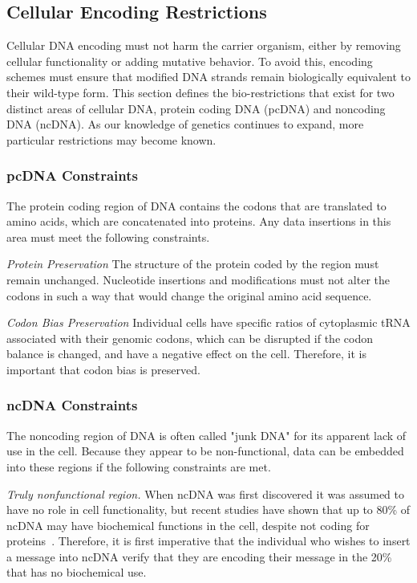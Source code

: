 \documentclass{bioinfo}
\begin{document}
\subsection{Cellular Encoding Restrictions}

Cellular DNA encoding must not harm the carrier organism, either by removing cellular functionality or adding mutative behavior. To avoid this, encoding schemes must ensure that modified DNA strands remain biologically equivalent to their wild-type form. This section defines the bio-restrictions that exist for two distinct areas of cellular DNA, protein coding DNA (pcDNA) and noncoding DNA (ncDNA). As our knowledge of genetics continues to expand, more particular restrictions may become known.

\subsubsection{pcDNA Constraints}

The protein coding region of DNA contains the codons that are translated to amino acids, which are concatenated into proteins. Any data insertions in this area must meet the following constraints.

\textit{Protein Preservation} The structure of the protein coded by the region must remain unchanged. Nucleotide insertions and modifications must not alter the codons in such a way that would change the original amino acid sequence.

\textit{Codon Bias Preservation} Individual cells have specific ratios of cytoplasmic tRNA associated with their genomic codons, which can be disrupted if the codon balance is changed, and have a negative effect on the cell. Therefore, it is important that codon bias is preserved.

\subsubsection{ncDNA Constraints}

The noncoding region of DNA is often called "junk DNA" for its apparent lack of use in the cell. Because they appear to be non-functional, data can be embedded into these regions if the following constraints are met.

\textit{Truly nonfunctional region.} When ncDNA was first discovered it was assumed to have no role in cell functionality, but recent studies have shown that up to 80\% of ncDNA may have biochemical functions in the cell, despite not coding for proteins~\cite{EPC2012N}. Therefore, it is first imperative that the individual who wishes to insert a message into ncDNA verify that they are encoding their message in the 20\% that has no biochemical use.
\end{document}
